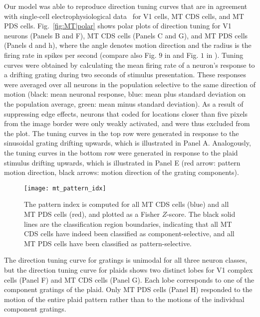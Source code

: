 Our model was able to reproduce direction tuning curves
that are in agreement with single-cell electrophysiological
data~\citep{Movshon1985,RodmanAlbright1989,MovshonNewsome1996}
for \ac{V1} cells, \ac{MT} \ac{CDS} cells, and \ac{MT} \ac{PDS}
cells.
Fig.~\ref{fig:MT|polar} shows polar plots of direction tuning for 
\ac{V1} neurons (Panels B and F), \ac{MT} \ac{CDS} cells 
(Panels C and G), and \ac{MT} \ac{PDS} cells (Panels d and h), 
where the angle denotes
motion direction and the radius is the firing rate in spikes per
second (compare also Fig. $9$ in \cite{SimoncelliHeeger1998}
and Fig. $1$ in \cite{Rust2006}). Tuning curves were obtained
by calculating the mean firing rate of a neuron's response to a
drifting grating during two seconds of stimulus presentation.
These responses were averaged over all neurons in the population
selective to the same direction of motion (black: mean
neuronal response, blue: mean plus standard deviation on the
population average, green: mean minus standard deviation).
As a result of suppressing edge effects, neurons that coded for
locations closer than five pixels from the image border were
only weakly activated, and were thus excluded from the plot.
The tuning curves in the top row were generated in response to
the sinusoidal grating drifting upwards, which is illustrated in
Panel A. Analogously, the tuning curves in the bottom row
were generated in response to the plaid stimulus drifting upwards,
which is illustrated in Panel E (red arrow: pattern motion
direction, black arrows: motion direction of the grating components).
\begin{figure}[t]
  \centering
  \texttt{[image: mt\_pattern\_idx]}
  \caption{
  The pattern index is computed for all \ac{MT} \ac{CDS} cells
  (blue) and all \ac{MT} \ac{PDS} cells (red), and plotted as a 
  Fisher $Z$-score. The black solid lines are the classification 
  region boundaries, indicating that all \ac{MT} \ac{CDS} cells have
  indeed been classified as component-selective, and all \ac{MT}
  \ac{PDS} cells have been classified as pattern-selective.}
  \label{fig:MT|patternIdx}
\end{figure}
The direction tuning curve for gratings is unimodal
for all three neuron classes, but the direction tuning curve for
plaids shows two distinct lobes for \ac{V1} complex cells (Panel F)
and \ac{MT} \ac{CDS} cells (Panel G). Each lobe corresponds to one of
the component gratings of the plaid. Only \ac{MT} \ac{PDS} cells (Panel
H) responded to the motion of the entire plaid pattern rather
than to the motions of the individual component gratings.

